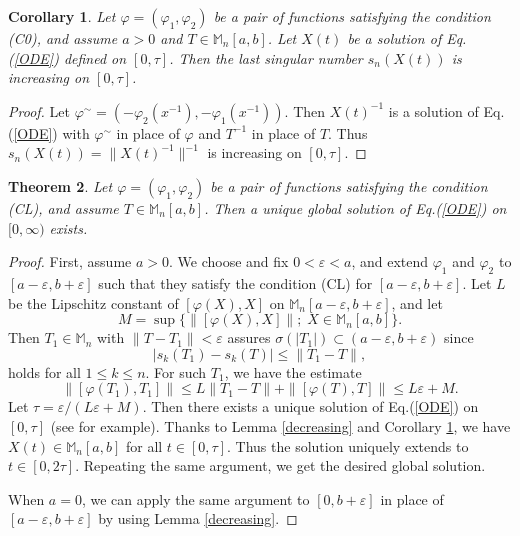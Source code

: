 \documentclass[12pt]{article}
\newtheorem{theorem}{Theorem}[section]
\newtheorem{cor}[theorem]{Corollary}
\theoremstyle{definition}
\numberwithin{equation}{section}
\newcommand{\M}{\mathbb{M}}
\begin{document}
\begin{cor}\label{increasing}
Let $\varphi=(\varphi_1,\varphi_2)$ be a pair of functions satisfying the condition (C0), 
and assume $a>0$ and $T\in \M_n[a,b]$. 
Let $X(t)$ be a solution of Eq.(\ref{ODE}) defined on $[0,\tau]$. 
Then the last singular number $s_n(X(t))$ is increasing on $[0,\tau]$. 
\end{cor}

\begin{proof}
Let $\varphi^{\sim}=(-\varphi_2(x^{-1}),-\varphi_1(x^{-1}))$. 
Then $X(t)^{-1}$ is a solution of Eq.(\ref{ODE}) with $\varphi^\sim$ in place of $\varphi$ 
and $T^{-1}$ in place of $T$. 
Thus $s_n(X(t))=\|X(t)^{-1}\|^{-1}$ is increasing on $[0,\tau]$.  
\end{proof}

\begin{theorem}\label{exi&uni}
Let $\varphi=(\varphi_1,\varphi_2)$ be a pair of functions satisfying the condition (CL), 
and assume $T\in \M_n[a,b]$. 
Then a unique global solution of Eq.(\ref{ODE}) on $[0,\infty)$ exists. 	
\end{theorem}

\begin{proof}
First, assume $a>0$. 
We choose and fix $0<\varepsilon <a$, and extend $\varphi_1$ and $\varphi_2$ to $[a-\varepsilon,b+\varepsilon]$ 
such that they satisfy the condition (CL) for $[a-\varepsilon,b+\varepsilon]$. 
Let $L$ be the Lipschitz constant of $[\varphi(X),X]$ on $\M_n[a-\varepsilon,b+\varepsilon]$, 
and let 
\[M=\sup\{\|[\varphi(X),X]\|;\;X\in \M_n[a,b]\}.\]
Then $T_1\in \M_n$ with $\|T-T_1\|<\varepsilon$ assures $\sigma(|T_1|)\subset (a-\varepsilon,b+\varepsilon)$ 
since 
\[|s_k(T_1)-s_k(T)|\leq \|T_1-T\|,\]
holds for all $1\leq k\leq n$. 
For such $T_1$, we have the estimate 
\[ \|[\varphi(T_1),T_1]\|\leq L\|T_1-T\|+\|[\varphi(T),T]\|\leq L\varepsilon+M.\]
Let $\tau=\varepsilon/(L\varepsilon+M)$. 
Then there exists a unique solution of Eq.(\ref{ODE}) on $[0,\tau]$ 
(see \cite[Theorem 2.2]{Te2012} for example). 
Thanks to Lemma \ref{decreasing} and Corollary \ref{increasing}, we have 
$X(t)\in \M_n[a,b]$ for all $t\in [0,\tau]$. 
Thus the solution uniquely extends to $t\in [0,2\tau]$. 
Repeating the same argument, we get the desired global solution.  

When $a=0$, we can apply the same argument to $[0,b+\varepsilon]$ in place of 
$[a-\varepsilon,b+\varepsilon]$ by using Lemma \ref{decreasing}. 
\end{proof}
\end{document}

